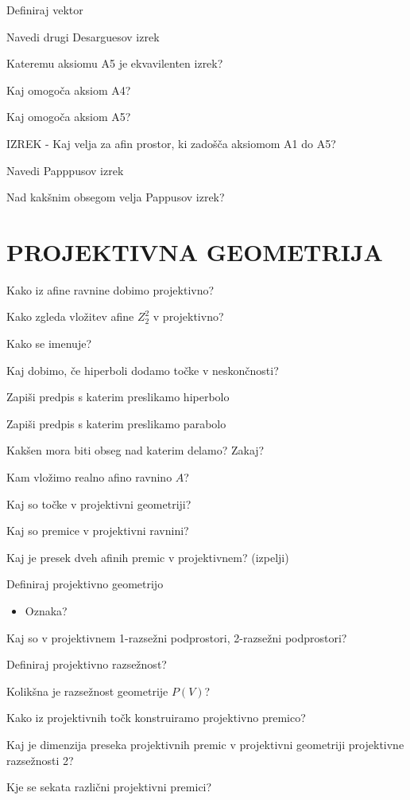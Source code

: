 \documentclass{article}
\begin{document}
\begin{enumerate}
        \item Definiraj vektor
        \item Navedi drugi Desarguesov izrek
        {\color{red}\item Kateremu aksiomu A5 je ekvavilenten izrek?}
        \item Kaj omogoča aksiom A4?
        \item Kaj omogoča aksiom A5?
        {\color{red}\item IZREK - Kaj velja za afin prostor, ki zadošča aksiomom A1 do A5?}
        {\color{red}\item Navedi Papppusov izrek}
        \item Nad kakšnim obsegom velja Pappusov izrek?
    \end{enumerate}


    \section{PROJEKTIVNA GEOMETRIJA}
    \begin{enumerate}
        \item Kako iz afine ravnine dobimo projektivno?
        \item Kako zgleda vložitev afine $Z^2_2$ v projektivno?
        \item Kako se imenuje?
        \item Kaj dobimo, če hiperboli dodamo točke v neskončnosti?
        \item Zapiši predpis s katerim preslikamo hiperbolo
        \item Zapiši predpis s katerim preslikamo parabolo
        {\color{red}\item Kakšen mora biti obseg nad katerim delamo? Zakaj?}
        {\color{red}\item Kam vložimo realno afino ravnino $A$?}
        \item Kaj so točke v projektivni geometriji?
        \item Kaj so premice v projektivni ravnini?
        \item Kaj je presek dveh afinih premic v projektivnem? (izpelji)
        \item Definiraj projektivno geometrijo
        \begin{itemize}
            \item Oznaka?
        \end{itemize}
        \item Kaj so v projektivnem 1-razsežni podprostori, 2-razsežni podprostori?
        {\color{red}\item Definiraj projektivno razsežnost?}
        \item Kolikšna je razsežnost geometrije $P(V)$?
        \item Kako iz projektivnih točk konstruiramo projektivno premico?
        {\color{red}\item Kaj je dimenzija preseka projektivnih premic v projektivni geometriji projektivne razsežnosti 2?}
        {\color{red}\item Kje se sekata različni projektivni premici?}
    \end{enumerate}
\end{document}
